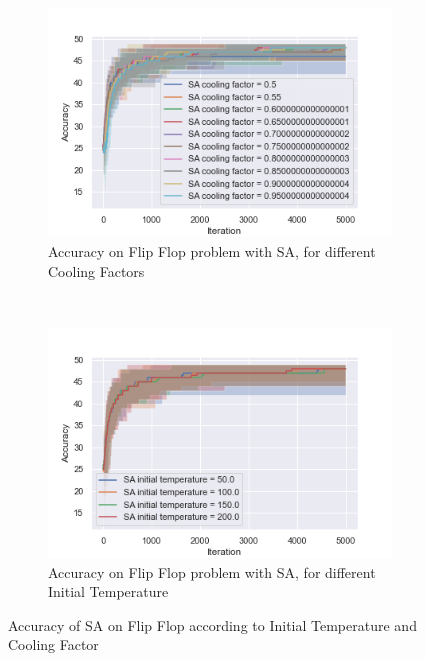 \documentclass[10pt]{article}
\begin{document}
				\begin{figure}[h]
					\begin{subfigure}[t]{0.45\columnwidth}
						\centering
						\includegraphics[width=\linewidth]{../graphics/flip_flop_SA_Iteration_Error_SA_cooling_factor.png}
						\caption{Accuracy on Flip Flop problem with SA, for different Cooling Factors}
						\label{ff:sa_cooling}
					\end{subfigure}
					~
					\begin{subfigure}[t]{0.45\columnwidth}
						\centering
						\includegraphics[width=\linewidth]{../graphics/flip_flop_SA_Iteration_Error_SA_initial_temperature.png}
						\caption{Accuracy on Flip Flop problem with SA, for different Initial Temperature}
						\label{ff:sa_initial_temp}
					\end{subfigure}
					\caption{Accuracy of SA on Flip Flop according to Initial Temperature and Cooling Factor}
					\label{ff:sa}
				\end{figure}
\end{document}
